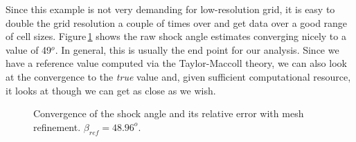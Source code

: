 \medskip
Since this example is not very demanding for low-resolution grid, 
it is easy to double the grid resolution a couple of times over and get
data over a good range of cell sizes.
Figure\,\ref{cone20-grid-convergence-fig} shows the raw shock angle estimates
converging nicely to a value of 49$^o$.
In general, this is usually the end point for our analysis.
Since we have a reference value computed via the Taylor-Maccoll theory,
we can also look at the convergence to the \textit{true} value and,
given sufficient computational resource, 
it looks at though we can get as close as we wish.

\begin{figure}
 \centering
 \parbox{0.45\textwidth}{
 }
 \parbox{0.45\textwidth}{
 }
 \caption{Convergence of the shock angle and its relative error with mesh refinement.
          $\beta_{ref} = 48.96^o$.}
 \label{cone20-grid-convergence-fig}
\end{figure}


